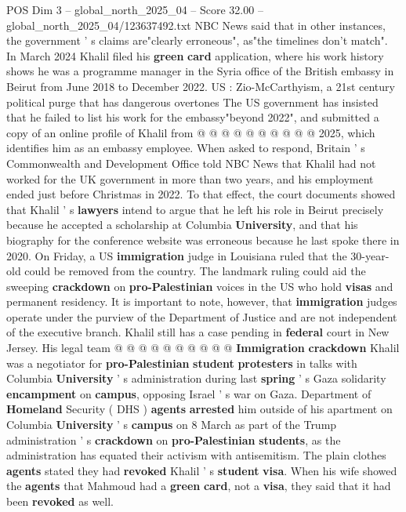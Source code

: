 \begin{textsample}{POS Dim 3 – global\_north\_2025\_04 – Score 32.00 – global\_north\_2025\_04/123637492.txt}
NBC News said that in other instances, the government ' s claims are"clearly erroneous", as"the timelines don't match".
In March 2024 Khalil filed his \textbf{green} \textbf{card} application, where his work history shows he was a programme manager in the Syria office of the British embassy in Beirut from June 2018 to December 2022.
US : Zio-McCarthyism, a 21st century political purge that has dangerous overtones The US government has insisted that he failed to list his work for the embassy"beyond 2022", and submitted a copy of an online profile of Khalil from @ @ @ @ @ @ @ @ @ @ 2025, which identifies him as an embassy employee.
When asked to respond, Britain ' s Commonwealth and Development Office told NBC News that Khalil had not worked for the UK government in more than two years, and his employment ended just before Christmas in 2022.
To that effect, the court documents showed that Khalil ' s \textbf{lawyers} intend to argue that he left his role in Beirut precisely because he accepted a scholarship at Columbia \textbf{University}, and that his biography for the conference website was erroneous because he last spoke there in 2020.
On Friday, a US \textbf{immigration} judge in Louisiana ruled that the 30-year-old could be removed from the country.
The landmark ruling could aid the sweeping \textbf{crackdown} on \textbf{pro-Palestinian} voices in the US who hold \textbf{visas} and permanent residency.
It is important to note, however, that \textbf{immigration} judges operate under the purview of the Department of Justice and are not independent of the executive branch.
Khalil still has a case pending in \textbf{federal} court in New Jersey.
His legal team @ @ @ @ @ @ @ @ @ @ \textbf{Immigration} \textbf{crackdown} Khalil was a negotiator for \textbf{pro-Palestinian} \textbf{student} \textbf{protesters} in talks with Columbia \textbf{University} ' s administration during last \textbf{spring} ' s Gaza solidarity \textbf{encampment} on \textbf{campus}, opposing Israel ' s war on Gaza.
Department of \textbf{Homeland} Security ( DHS ) \textbf{agents} \textbf{arrested} him outside of his apartment on Columbia \textbf{University} ' s \textbf{campus} on 8 March as part of the Trump administration ' s \textbf{crackdown} on \textbf{pro-Palestinian} \textbf{students}, as the administration has equated their activism with antisemitism.
The plain clothes \textbf{agents} stated they had \textbf{revoked} Khalil ' s \textbf{student} \textbf{visa}.
When his wife showed the \textbf{agents} that Mahmoud had a \textbf{green} \textbf{card}, not a \textbf{visa}, they said that it had been \textbf{revoked} as well.

\end{textsample}
